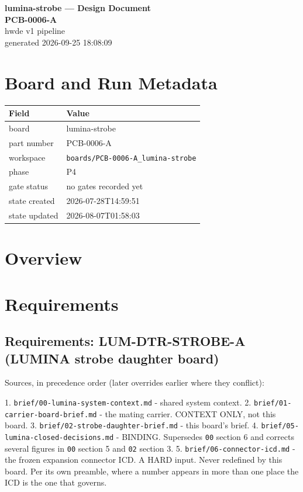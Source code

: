 \documentclass[11pt,a4paper]{article}
\begin{document}
\sloppy
\begin{center}
{\LARGE\bfseries lumina-strobe --- Design Document}\\[6pt]
{\Large\bfseries PCB-0006-A}\\[6pt]
{\large hwde v1 pipeline}\\[2pt]
generated 2026-09-25 18:08:09
\end{center}
\tableofcontents

\section{Board and Run Metadata}
{\small
\begin{longtable}{lp{11cm}}
\toprule
\textbf{Field} & \textbf{Value} \\
\midrule
\endhead
board & lumina-strobe \\
part number & PCB-0006-A \\
workspace & \texttt{boards/PCB-0006-A\_lumina-strobe} \\
phase & P4 \\
gate status & no gates recorded yet \\
state created & 2026-07-28T14:59:51 \\
state updated & 2026-08-07T01:58:03 \\
\bottomrule
\end{longtable}
}
\section{Overview}
\section{Requirements}
\subsection*{Requirements: LUM-DTR-STROBE-A (LUMINA strobe daughter board)}
Sources, in precedence order (later overrides earlier where they conflict):

1. \texttt{brief/00-lumina-system-context.md} - shared system context. 2. \texttt{brief/01-carrier-board-brief.md} - the mating carrier. CONTEXT ONLY, not this board. 3. \texttt{brief/02-strobe-daughter-brief.md} - this board's brief. 4. \texttt{brief/05-lumina-closed-decisions.md} - BINDING. Supersedes \texttt{00} section 6 and corrects several figures in \texttt{00} section 5 and \texttt{02} section 3. 5. \texttt{brief/06-connector-icd.md} - the frozen expansion connector ICD. A HARD input. Never redefined by this board. Per its own preamble, where a number appears in more than one place the ICD is the one that governs.
\end{document}
